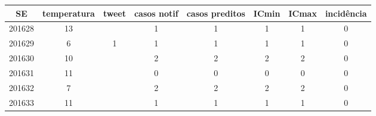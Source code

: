 \begin{tabular}{c|ccccccc}
  \hline
SE & temperatura & tweet & casos notif & casos preditos & ICmin & ICmax & incidência \\ 
  \hline
201628 & 13 &  & 1 & 1 & 1 & 1 & 0 \\ 
  201629 & 6 & 1 & 1 & 1 & 1 & 1 & 0 \\ 
  201630 & 10 &  & 2 & 2 & 2 & 2 & 0 \\ 
  201631 & 11 &  & 0 & 0 & 0 & 0 & 0 \\ 
  201632 & 7 &  & 2 & 2 & 2 & 2 & 0 \\ 
  201633 & 11 &  & 1 & 1 & 1 & 1 & 0 \\ 
   \hline
\end{tabular}
